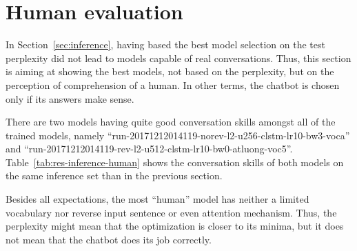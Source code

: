 \section{Human evaluation}
In Section~\ref{sec:inference}, having based the best model selection on the test perplexity did not lead to models capable of real conversations. Thus, this section is aiming at showing the best models, not based on the perplexity, but on the perception of comprehension of a human. In other terms, the chatbot is chosen only if its answers make sense.

There are two models having quite good conversation skills amongst all of the trained models, namely ``run-20171212014119-norev-l2-u256-clstm-lr10-bw3-voca'' and ``run-20171212014119-rev-l2-u512-clstm-lr10-bw0-atluong-voc5''. Table~\ref{tab:res-inference-human} shows the conversation skills of both models on the same inference set than in the previous section.

Besides all expectations, the most ``human'' model has neither a limited vocabulary nor reverse input sentence or even attention mechanism. Thus, the perplexity might mean that the optimization is closer to its minima, but it does not mean that the chatbot does its job correctly.

